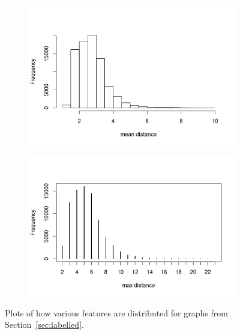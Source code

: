 \documentclass{l4proj}
\theoremstyle{definition}
\theoremstyle{remark}
\begin{document}
\begin{figure}
\begin{subfigure}[t]{0.49\textwidth}
  \end{subfigure}
  \begin{subfigure}[t]{0.49\textwidth}
    \centering
    \includegraphics[width=\textwidth]{images/mcs_meandist.png}
  \end{subfigure}
  \begin{subfigure}[t]{0.49\textwidth}
    \centering
    \includegraphics[width=\textwidth]{images/mcs_maxdist.png}
  \end{subfigure}
  \caption{Plots of how various features are distributed for graphs from
    Section~\ref{sec:labelled}.}
  \label{fig:mcs_features1}
\end{figure}
\end{document}
